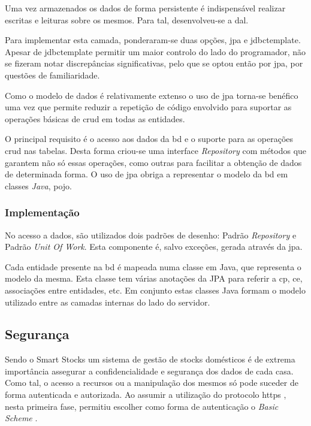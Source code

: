 Uma vez armazenados os dados de forma persistente é indispensável realizar escritas e leituras sobre os mesmos. Para tal, desenvolveu-se a \acrfull{dal}. 

Para implementar esta camada, ponderaram-se duas opções, \gls{jpa} e \gls{jdbctemplate}. Apesar de \acrshort{jdbctemplate} permitir um maior controlo do lado do programador, não se fizeram notar discrepâncias significativas, pelo que se optou então por \acrshort{jpa}, por questões de familiaridade.

Como o modelo de dados é relativamente extenso o uso de \acrshort{jpa} torna-se benéfico uma vez que permite reduzir a repetição de código envolvido para suportar as operações básicas de \acrfull{crud} em todas as entidades. 

O principal requisito é o acesso aos dados da \acrshort{bd} e o suporte para as operações \acrshort{crud} nas tabelas. Desta forma criou-se uma interface \textit{Repository} com métodos que garantem não só essas operações, como outras para facilitar a obtenção de dados de determinada forma. O uso de \acrshort{jpa} obriga a representar o modelo da \acrshort{bd} em classes \textit{Java}, \acrfull{pojo}.

\subsubsection{Implementação}\label{subsubsec4221}

No acesso a dados, são utilizados dois padrões de desenho: Padrão \textit{Repository} e Padrão \textit{Unit Of Work}. Esta componente é, salvo exceções, gerada através da \acrshort{jpa}.

Cada entidade presente na \acrshort{bd} é mapeada numa classe em Java, que representa o modelo da mesma. Esta classe tem várias anotações da JPA para referir a \acrlong{cp}, \acrlong{ce}, associações entre entidades, etc. Em conjunto estas classes Java formam o modelo utilizado entre as camadas internas do lado do servidor.


%
%
\subsection{Segurança}\label{subsec423}

Sendo o Smart Stocks um sistema de gestão de stocks domésticos é de extrema importância assegurar a confidencialidade e segurança dos dados de cada casa. Como tal, o acesso a recursos ou a manipulação dos mesmos só pode suceder de forma autenticada e autorizada. Ao assumir a utilização do protocolo \acrfull{https} \cite{RFC2660:https}, nesta primeira fase, permitiu escolher como forma de autenticação o \textit{Basic Scheme} \cite{RFC7617:basicSheme} .


